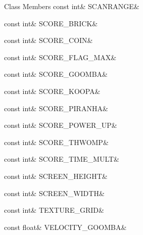 \begin{DoxyFields}{Class Members}
\mbox{\label{namespaceMelloMario_1_1Theming_ad01429ef079d8b9668f7337d1617a7a5}} 
const int&
SCANRANGE&
\\
\hline

\mbox{\label{namespaceMelloMario_1_1Theming_af918e2eaead6e368b313833b8dbe3dce}} 
const int&
SCORE\_BRICK&
\\
\hline

\mbox{\label{namespaceMelloMario_1_1Theming_a204124ae11eacb005f72ed064a81053e}} 
const int&
SCORE\_COIN&
\\
\hline

\mbox{\label{namespaceMelloMario_1_1Theming_a7987d3227e4435119f89a6e8c80aa86b}} 
const int&
SCORE\_FLAG\_MAX&
\\
\hline

\mbox{\label{namespaceMelloMario_1_1Theming_a34819cdfa79f2df527e122e7c844d7f2}} 
const int&
SCORE\_GOOMBA&
\\
\hline

\mbox{\label{namespaceMelloMario_1_1Theming_aa666f74a9ea23d212615aac2a978249d}} 
const int&
SCORE\_KOOPA&
\\
\hline

\mbox{\label{namespaceMelloMario_1_1Theming_aa53c9513aa8992f0f1b9a7b69a5b24e0}} 
const int&
SCORE\_PIRANHA&
\\
\hline

\mbox{\label{namespaceMelloMario_1_1Theming_ad8c0c75c6494a8ac1b2a8542e56fc8bc}} 
const int&
SCORE\_POWER\_UP&
\\
\hline

\mbox{\label{namespaceMelloMario_1_1Theming_aeb4d62c9211a6169dd7edc7ad2eed79a}} 
const int&
SCORE\_THWOMP&
\\
\hline

\mbox{\label{namespaceMelloMario_1_1Theming_a30e486369ca1ca65e95a8902122b4c29}} 
const int&
SCORE\_TIME\_MULT&
\\
\hline

\mbox{\label{namespaceMelloMario_1_1Theming_ab9136a450981c08f9f03fe35809c463f}} 
const int&
SCREEN\_HEIGHT&
\\
\hline

\mbox{\label{namespaceMelloMario_1_1Theming_a274496fcae19ccd6324edb049d1c2d5d}} 
const int&
SCREEN\_WIDTH&
\\
\hline

\mbox{\label{namespaceMelloMario_1_1Theming_a35702d66e6e548fc80bc854d8f5ddd4f}} 
const int&
TEXTURE\_GRID&
\\
\hline

\mbox{\label{namespaceMelloMario_1_1Theming_a7df662f548171aa8c65d5b635abf9841}} 
const float&
VELOCITY\_GOOMBA&
\\
\hline


\end{DoxyFields}
